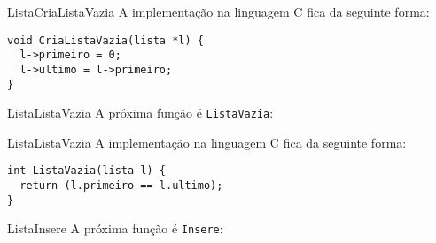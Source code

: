 \documentclass[aspectratio=169]{beamer}
\begin{document}

\begin{frame}[fragile]{Lista}{CriaListaVazia}
A implementação na linguagem C fica da seguinte forma:

\begin{lstlisting}[style=CStyle]
void CriaListaVazia(lista *l) { 
  l->primeiro = 0;
  l->ultimo = l->primeiro;
}
\end{lstlisting}  
\end{frame}


\begin{frame}[fragile]{Lista}{ListaVazia}
A próxima função é \verb|ListaVazia|:
\begin{algorithm}[H]
\caption{ListaVazia} 
\label{ListaVazia}
\end{algorithm}
\end{frame}


\begin{frame}[fragile]{Lista}{ListaVazia}
A implementação na linguagem C fica da seguinte forma:

\begin{lstlisting}[style=CStyle]
int ListaVazia(lista l) { 
  return (l.primeiro == l.ultimo);
} 
\end{lstlisting}  
\end{frame}


\begin{frame}[fragile]{Lista}{Insere}
A próxima função é \verb|Insere|:
\begin{algorithm}[H]
\caption{Inserir} 
\label{Inserir}
\end{algorithm}
\end{frame}
\end{document}
